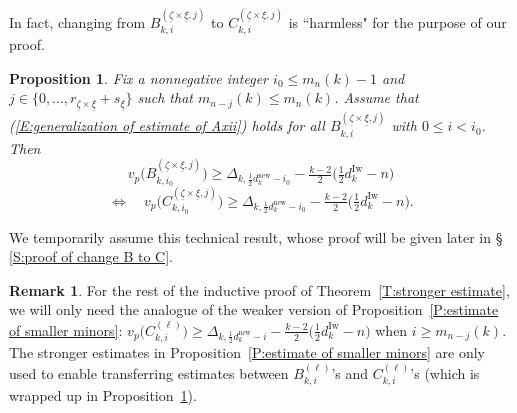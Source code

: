 \documentclass[12pt]{amsart}
\newtheorem{proposition}[subsection]{Proposition}
\theoremstyle{definition}
\newtheorem{remark}[subsection]{Remark}
\numberwithin{equation}{subsection}
\newcommand{\new}{\mathrm{new}}
\newcommand{\Iw}{\mathrm{Iw}}
\begin{document}
In fact, changing from $B_{k, i}^{(\underline \zeta \times \underline \xi, j)}$ to $C_{k, i}^{(\underline \zeta \times \underline \xi, j)}$ is ``harmless" for the purpose of our proof.
\begin{proposition}
\label{P:change B to C}
Fix a nonnegative integer $i_0\leq m_n(k)-1$ and $j \in \{0, \dots,  r_{\underline \zeta \times \underline \xi}+ s_{\underline \xi}\}$ such that $m_{n-j}(k) \leq m_n(k)$.
Assume that (\ref{E:generalization of estimate of Axii}) holds for all $B_{k,i}^{(\underline\zeta\times \underline \xi,j)}$ with $0\leq i<i_0$. Then %
$$
v_p\big( B_{k, i_0}^{(\underline \zeta \times \underline \xi, j)}\big)  \geq \Delta_{k, \frac 12d_k^\new -i_0} - \tfrac{k-2}2\big( \tfrac 12d_k^\Iw-n\big)
$$
$$
\Longleftrightarrow \quad v_p\big( C_{k, i_0}^{(\underline \zeta \times \underline \xi, j)}\big)  \geq \Delta_{k, \frac 12d_k^\new -i_0} - \tfrac{k-2}2\big( \tfrac 12d_k^\Iw-n\big).
$$
\end{proposition}

We temporarily assume this technical result, whose proof will be given later in \S\,\ref{S:proof of change B to C}.
\begin{remark}
For the rest of the inductive proof of Theorem~\ref{T:stronger estimate}, we will only need the analogue of the weaker version of Proposition~\ref{P:estimate of smaller minors}: $v_p\big( C_{k, i}^{( \ell)}\big)  \geq \Delta_{k, \frac 12d_k^\new -i} - \tfrac{k-2}2\big( \tfrac 12d_k^\Iw-n\big)$ when $i \geq m_{n-j}(k)$. The stronger estimates in Proposition~\ref{P:estimate of smaller minors} are only used to enable transferring estimates between $B_{k,i}^{( \ell)}$'s and  $C_{k,i}^{( \ell)}$'s (which is wrapped up in Proposition~\ref{P:change B to C}).
\end{remark}
\end{document}
